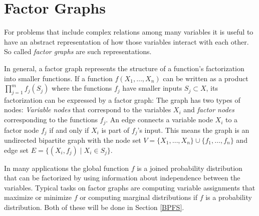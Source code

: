 \section{Factor Graphs}

For problems that include complex relations among many variables it is useful to have an abstract representation of how those	variables interact with each other. So called \emph{factor graphs} are such representations.\newline

In general, a factor graph represents the structure of a function's factorization into smaller functions. \newline If a function $f(X_1, \ldots, X_n)$ can be written as a product $\prod_{j=1}^{m}{f_j(S_j)}$  where the functions $f_j$ have smaller inputs $S_j \subset X$, its factorization 
can be expressed by a factor graph: The graph has two types of nodes: 
\emph{Variable nodes} that correspond to the variables $X_i$ and \emph{factor nodes} corresponding to the functions $f_j$. An edge connects a variable node $X_i$ to a factor node $f_j$ if and only if $X_i$ is part of $f_j$'s input. 
This means the graph is an undirected bipartite graph with the node set $ V = \{X_1, \ldots, X_n\} \cup \{f_1, \ldots, f_n\}$ and edge set $E = \{(X_i, f_j) \; | \; X_i \in S_j\}$. 

In many applications the global function $f$ is a joined probability distribution that can be factorized by using information about independence between the variables. Typical tasks on factor graphs are computing variable assignments that maximize or minimize $f$ or computing marginal distributions if $f$ is a probability distribution. Both of these will be done in Section \ref{BPFS}.

